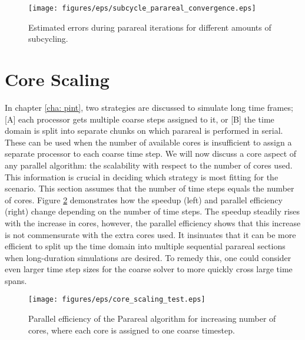   \begin{figure}[h]
    \centering
    \texttt{[image: figures/eps/subcycle\_parareal\_convergence.eps]}
    \caption{Estimated errors during parareal iterations for different amounts of subcycling.}
    \label{fig: temporal-subcycling-errors}
\end{figure}

\section{Core Scaling}
In chapter \ref{cha: pint}, two strategies are discussed to simulate long time frames; [A] each processor gets multiple coarse steps assigned to it, or [B] the time domain is split into separate chunks on which parareal is performed in serial. These can be used when the number of available cores is insufficient to assign a separate processor to each coarse time step.
We will now discuss a core aspect of any parallel algorithm: the scalability with respect to the number of cores used. This information is crucial in deciding which strategy is most fitting for the scenario. This section assumes that the number of time steps equals the number of cores. Figure \ref{fig: core scaling} demonstrates how the speedup (left) and parallel efficiency (right) change depending on the number of time steps. The speedup steadily rises with the increase in cores, however, the parallel efficiency shows that this increase is not commensurate with the extra cores used. It insinuates that it can be more efficient to split up the time domain into multiple sequential parareal sections when long-duration simulations are desired. To remedy this, one could consider even larger time step sizes for the coarse solver to more quickly cross large time spans.  
  \begin{figure}[h]
    \centering
    \texttt{[image: figures/eps/core\_scaling\_test.eps]}
    \caption{Parallel efficiency of the Parareal algorithm for increasing number of cores, where each core is assigned to one coarse timestep. }
    \label{fig: core scaling}
\end{figure}

